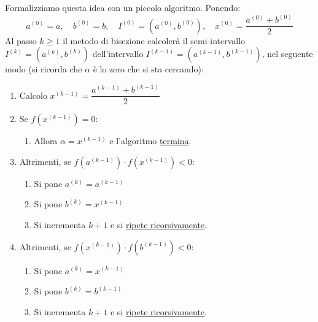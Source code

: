 \documentclass[a4paper]{article}
\begin{document}
    \newpage

    \noindent
    Formalizziamo questa idea con un piccolo algoritmo. Ponendo:
    \begin{equation*}
        a^{(0)} = a, \hspace{1em} b^{(0)} = b, \hspace{1em} I^{(0)} = \left(a^{(0)}, b^{(0)}\right), \hspace{1em} x^{(0)} = \dfrac{a^{(0)} + b^{(0)}}{2}
    \end{equation*}
    Al passo $k \ge 1$ il metodo di bisezione calcolerà il semi-intervallo $I^{(k)} = \left(a^{(k)}, b^{(k)}\right)$ dell'intervallo $I^{(k-1)} = \left(a^{\left(k-1\right)}, b^{\left(k-1\right)}\right)$, nel seguente modo (si ricorda che $\alpha$ è lo zero che si sta cercando):
    \begin{enumerate}
        \item Calcolo $x^{\left(k-1\right)} = \dfrac{a^{\left(k-1\right)} + b^{\left(k-1\right)}}{2}$

        \item Se $f\left(x^{\left(k-1\right)}\right) = 0$:
        \begin{enumerate}
            \item Allora $\alpha = x^{\left(k-1\right)}$ e l'algoritmo \underline{termina}.
        \end{enumerate}
        
        \item Altrimenti, se $f\left(a^{\left(k-1\right)}\right) \cdot f\left(x^{\left(k-1\right)}\right) < 0$:
        \begin{enumerate}
            \item Si pone $a^{(k)} = a^{\left(k-1\right)}$
            \item Si pone $b^{(k)} = x^{\left(k-1\right)}$
            \item Si incrementa $k+1$ e si \underline{ripete ricorsivamente}.
        \end{enumerate}
        
        \item Altrimenti, se $f\left(x^{\left(k-1\right)}\right) \cdot f\left(b^{\left(k-1\right)}\right) < 0$:
        \begin{enumerate}
            \item Si pone $a^{(k)} = x^{\left(k-1\right)}$
            \item Si pone $b^{(k)} = b^{\left(k-1\right)}$
            \item Si incrementa $k+1$ e si \underline{ripete ricorsivamente}.
        \end{enumerate}
    \end{enumerate}
\end{document}
